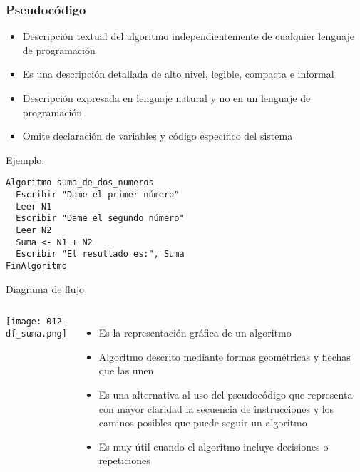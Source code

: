 \begin{frame}[fragile]
  \frametitle{Pseudocódigo}
  \begin{itemize}
    \item Descripción textual del algoritmo independientemente de cualquier
      lenguaje de programación
    \pausa
    \item Es una descripción detallada de alto nivel, legible, compacta e
      informal
    \pausa
    \item Descripción expresada en lenguaje natural y no en un lenguaje de
      programación
    \pausa
    \item Omite declaración de variables y código específico del sistema
  \end{itemize}
  \pausa
  Ejemplo:
  \begin{lstlisting}[style=pseudocodigo]
Algoritmo suma_de_dos_numeros
  Escribir "Dame el primer número"
  Leer N1
  Escribir "Dame el segundo número"
  Leer N2
  Suma <- N1 + N2
  Escribir "El resutlado es:", Suma
FinAlgoritmo
  \end{lstlisting}
\end{frame}

\begin{frame}[c]{Diagrama de flujo}
  \begin{columns}
      \begin{center}
        \texttt{[image: 012-df\_suma.png]}
      \end{center}
      \begin{itemize}
        \item Es la representación gráfica de un algoritmo
        \pausa
        \item Algoritmo descrito mediante formas geométricas y flechas que las unen
        \pausa
        \item Es una alternativa al uso del pseudocódigo que representa con mayor
          claridad la secuencia de instrucciones y los caminos posibles que puede
          seguir un algoritmo
        \pausa
        \item Es muy útil cuando el algoritmo incluye decisiones o repeticiones
      \end{itemize}
  \end{columns}
\end{frame}

